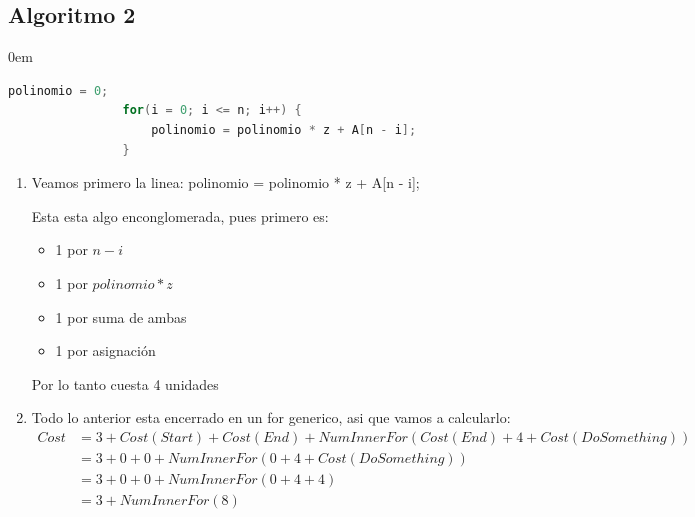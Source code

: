 \documentclass[12pt, fleqn]{article}                            %
\newenvironment{SmallIndentation}[1][0.75em]                    %
        {\begin{adjustwidth}{#1}{}\begin{footnotesize}}             %
        {\end{footnotesize}\end{adjustwidth}}                       %
\theoremstyle{break}                                            %
\begin{document}
    \subsection{Algoritmo 2}
    \begin{SmallIndentation}[0em]
            
        \begin{lstlisting}[language=C, gobble=12, basicstyle=\small\color{white}]
            polinomio = 0;                                  
                for(i = 0; i <= n; i++) {
                    polinomio = polinomio * z + A[n - i];       
                }
        \end{lstlisting}   



        \begin{enumerate}
            \item
                Veamos primero la linea: polinomio = polinomio * z + A[n - i];

                Esta esta algo enconglomerada, pues primero es:
                \begin{itemize}
                    \item 1 por $n - i$
                    \item 1 por $polinomio * z$
                    \item 1 por suma de ambas
                    \item 1 por asignación
                \end{itemize}

                Por lo tanto cuesta 4 unidades


            \item Todo lo anterior esta encerrado en un for generico, 
                asi que vamos a calcularlo:
                \begin{align*}
                    Cost 
                        &= 3 + Cost(Start) + Cost(End) + NumInnerFor(Cost(End) + 4 + Cost(DoSomething))     \\
                        &= 3 + 0 + 0 + NumInnerFor(0 + 4 + Cost(DoSomething))                               \\
                        &= 3 + 0 + 0 + NumInnerFor(0 + 4 + 4)                                               \\
                        &= 3 + NumInnerFor(8)                                                             
                \end{align*}


\end{enumerate}
\end{SmallIndentation}
\end{document}
